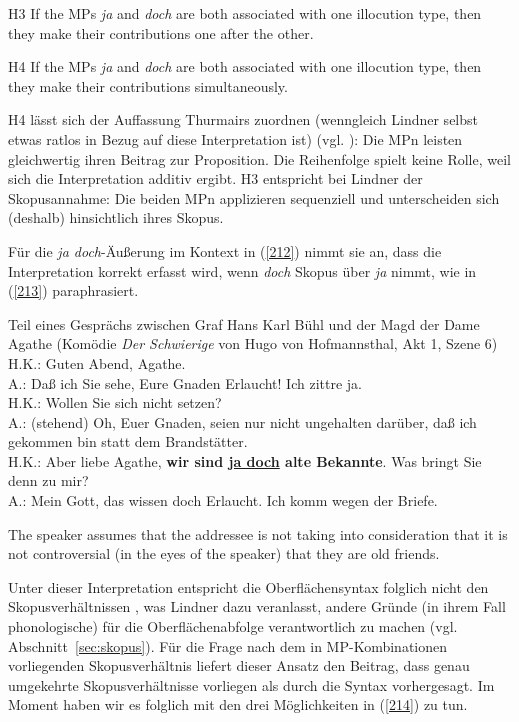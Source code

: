 \begin{exe}
	\ex\label{209} 
	H3 If the MPs \textit{ja} and \textit{doch} are both associated with one illocution type, then they make their contributions one after the other.
\end{exe}
	
\begin{exe}
	\ex\label{210} 
	H4 If the MPs \textit{ja} and \textit{doch} are both associated with one illocution type, then they make their contributions simultaneously.
	\hfill\hbox {\citet[194]{Lindner1991}}		
\end{exe}	
H4 lässt sich der Auffassung Thurmairs zuordnen (wenngleich Lindner selbst etwas ratlos in Bezug auf diese Interpretation ist) (vgl. \citeyear[196]{Lindner1991}): Die MPn leisten gleichwertig ihren Beitrag zur Proposition. Die Reihenfolge spielt keine Rolle, weil sich die Interpretation additiv ergibt. H3 entspricht bei Lindner der Skopusannahme: Die beiden MPn applizieren sequenziell und unterscheiden sich (deshalb) hinsichtlich ihres Skopus. 

Für die \textit{ja doch}-Äußerung im Kontext in (\ref{212}) nimmt sie an, dass die Interpretation korrekt erfasst wird, wenn \textit{doch} Skopus  über \textit{ja} nimmt, wie in (\ref{213}) paraphrasiert.

\begin{exe}
	\ex\label{212} 
	Teil eines Gesprächs zwischen Graf Hans Karl Bühl und der Magd der Dame Agathe (Komödie \textit{Der Schwierige} von Hugo von Hofmannsthal, Akt 1, 			Szene 6)\\
	H.K.: Guten Abend, Agathe.\\
	A.:	Daß ich Sie sehe, Eure Gnaden Erlaucht! Ich zittre ja.\\
	H.K.: Wollen Sie sich nicht setzen?\\
	A.: (stehend) Oh, Euer Gnaden, seien nur nicht ungehalten darüber, daß ich gekommen bin statt dem Brandstätter.\\
	H.K.: Aber liebe Agathe, \textbf{wir sind \underline{ja doch} alte Bekannte}. Was bringt Sie denn zu mir?\\
	A.:	Mein Gott, das wissen doch Erlaucht. Ich komm wegen der Briefe.	
\end{exe}
		
\begin{exe}
	\ex\label{213} 
	The speaker assumes that the addressee is not taking into consideration that it is not 
	controversial (in the eyes of the speaker) that they are old friends. 
	\hfill\hbox{\citet[195]{Lindner1991}}
\end{exe}
Unter dieser Interpretation entspricht die Oberflächensyntax folglich nicht den Skopusverhältnissen , was Lindner dazu veranlasst, andere Gründe (in ihrem Fall phonologische) für die Oberflächenabfolge verantwortlich zu machen (vgl. Abschnitt~\ref{sec:skopus}). Für die Frage nach dem in MP-Kombinationen vorliegenden Skopusverhältnis liefert dieser Ansatz den Beitrag, dass genau umgekehrte Skopusverhältnisse vorliegen als durch die Syntax vorhergesagt. Im Moment haben wir es folglich mit den drei Möglichkeiten in (\ref{214}) zu tun.
	

